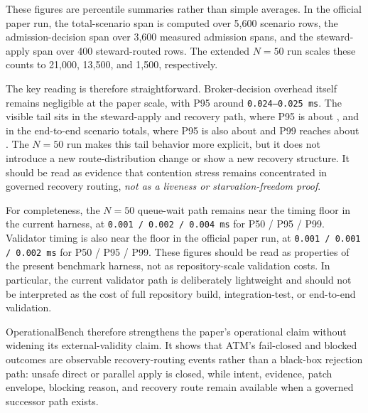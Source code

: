 \documentclass[9pt,letterpaper]{extarticle}
\begin{document}
These figures are percentile summaries rather than simple averages. In the official paper run, the total-scenario span is computed over 5,600 scenario rows, the admission-decision span over 3,600 measured admission spans, and the steward-apply span over 400 steward-routed rows. The extended $N = 50$ run scales these counts to 21,000, 13,500, and 1,500, respectively.

The key reading is therefore straightforward. Broker-decision overhead itself remains negligible at the paper scale, with P95 around \texttt{0.024--0.025 ms}. The visible tail sits in the steward-apply and recovery path, where P95 is about \texttt{}, and in the end-to-end scenario totals, where P95 is also about \texttt{} and P99 reaches about \texttt{}. The $N = 50$ run makes this tail behavior more explicit, but it does not introduce a new route-distribution change or show a new recovery structure. It should be read as evidence that contention stress remains concentrated in governed recovery routing, \emph{not as a liveness or starvation-freedom proof}.

For completeness, the $N = 50$ queue-wait path remains near the timing floor in the current harness, at \texttt{0.001 / 0.002 / 0.004 ms} for P50 / P95 / P99. Validator timing is also near the floor in the official paper run, at \texttt{0.001 / 0.001 / 0.002 ms} for P50 / P95 / P99. These figures should be read as properties of the present benchmark harness, not as repository-scale validation costs. In particular, the current validator path is deliberately lightweight and should not be interpreted as the cost of full repository build, integration-test, or end-to-end validation.

OperationalBench therefore strengthens the paper's operational claim without widening its external-validity claim. It shows that ATM's fail-closed and blocked outcomes are observable recovery-routing events rather than a black-box rejection path: unsafe direct or parallel apply is closed, while intent, evidence, patch envelope, blocking reason, and recovery route remain available when a governed successor path exists.
\end{document}
